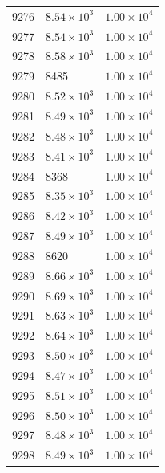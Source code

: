 \begin{table}[H]
\begin{tabular}{lll}
9276 & $\displaystyle 8.54 \times 10^{3}$ & $\displaystyle 1.00 \times 10^{4}$ \\
9277 & $\displaystyle 8.54 \times 10^{3}$ & $\displaystyle 1.00 \times 10^{4}$ \\
9278 & $\displaystyle 8.58 \times 10^{3}$ & $\displaystyle 1.00 \times 10^{4}$ \\
9279 & 8485 & $\displaystyle 1.00 \times 10^{4}$ \\
9280 & $\displaystyle 8.52 \times 10^{3}$ & $\displaystyle 1.00 \times 10^{4}$ \\
9281 & $\displaystyle 8.49 \times 10^{3}$ & $\displaystyle 1.00 \times 10^{4}$ \\
9282 & $\displaystyle 8.48 \times 10^{3}$ & $\displaystyle 1.00 \times 10^{4}$ \\
9283 & $\displaystyle 8.41 \times 10^{3}$ & $\displaystyle 1.00 \times 10^{4}$ \\
9284 & 8368 & $\displaystyle 1.00 \times 10^{4}$ \\
9285 & $\displaystyle 8.35 \times 10^{3}$ & $\displaystyle 1.00 \times 10^{4}$ \\
9286 & $\displaystyle 8.42 \times 10^{3}$ & $\displaystyle 1.00 \times 10^{4}$ \\
9287 & $\displaystyle 8.49 \times 10^{3}$ & $\displaystyle 1.00 \times 10^{4}$ \\
9288 & 8620 & $\displaystyle 1.00 \times 10^{4}$ \\
9289 & $\displaystyle 8.66 \times 10^{3}$ & $\displaystyle 1.00 \times 10^{4}$ \\
9290 & $\displaystyle 8.69 \times 10^{3}$ & $\displaystyle 1.00 \times 10^{4}$ \\
9291 & $\displaystyle 8.63 \times 10^{3}$ & $\displaystyle 1.00 \times 10^{4}$ \\
9292 & $\displaystyle 8.64 \times 10^{3}$ & $\displaystyle 1.00 \times 10^{4}$ \\
9293 & $\displaystyle 8.50 \times 10^{3}$ & $\displaystyle 1.00 \times 10^{4}$ \\
9294 & $\displaystyle 8.47 \times 10^{3}$ & $\displaystyle 1.00 \times 10^{4}$ \\
9295 & $\displaystyle 8.51 \times 10^{3}$ & $\displaystyle 1.00 \times 10^{4}$ \\
9296 & $\displaystyle 8.50 \times 10^{3}$ & $\displaystyle 1.00 \times 10^{4}$ \\
9297 & $\displaystyle 8.48 \times 10^{3}$ & $\displaystyle 1.00 \times 10^{4}$ \\
9298 & $\displaystyle 8.49 \times 10^{3}$ & $\displaystyle 1.00 \times 10^{4}$ \\

\end{tabular}
\end{table}

